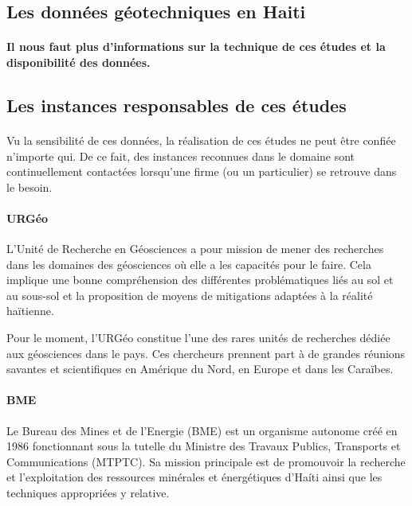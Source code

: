         \subsection{Les données géotechniques en Haiti}
        \paragraph{Il nous faut plus d'informations sur la technique de ces études et la disponibilité
        des données.}
        \lipsum[1]
        \subsection{Les instances responsables de ces études}
        \paragraph{}
        Vu la sensibilité de ces données, la réalisation de ces études ne peut être confiée n'importe qui. De ce 
        fait, des instances reconnues dans le domaine sont continuellement contactées 
        lorsqu'une firme (ou un particulier) se retrouve dans le besoin.
        \paragraph{URGéo}
        L'Unité de Recherche en Géosciences a pour mission de mener des recherches dans les
        domaines des géosciences où elle a les capacités pour le faire.
        Cela implique une bonne compréhension des différentes problématiques liés au sol et
        au sous-sol et la proposition de moyens de mitigations adaptées à la réalité haïtienne.
        \cite{mission_urgeo}
        \par
        Pour le moment, l’URGéo constitue l’une des rares unités de recherches dédiée aux
        géosciences dans le pays. 
        Ces chercheurs prennent part à de grandes réunions savantes et scientifiques en
        Amérique du Nord, en Europe et dans les Caraïbes.
        \cite{urgeo_nouvelliste}
        \paragraph{BME}
        Le Bureau des Mines et de l’Energie (BME) est un organisme autonome créé en 
        1986 fonctionnant sous la tutelle du Ministre des Travaux Publics, Transports 
        et Communications (MTPTC). Sa mission principale est de promouvoir la recherche
        et l'exploitation des ressources minérales et énergétiques d'Haíti ainsi que les 
        techniques appropriées y relative.
